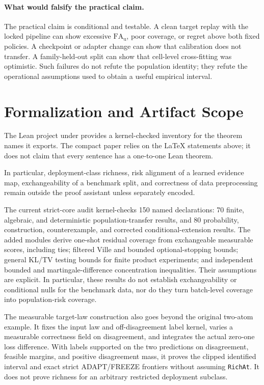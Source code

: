 \paragraph{What would falsify the practical claim.}
The practical claim is conditional and testable. A clean target replay with the locked pipeline can
show excessive $\mathrm{FA}_{\mathrm u}$, poor coverage, or regret above both fixed policies. A
checkpoint or adapter change can show that calibration does not transfer. A family-held-out split
can show that cell-level cross-fitting was optimistic. Such failures do not refute the population
identity; they refute the operational assumptions used to obtain a useful empirical interval.

\section{Formalization and Artifact Scope}
\label{app:compact-formal}

The Lean project under  provides a kernel-checked inventory for
the theorem names it exports. The compact paper relies on the LaTeX statements above; it does not
claim that every sentence has a one-to-one Lean theorem.

In particular, deployment-class richness,
risk alignment of a learned evidence map, exchangeability of a benchmark split, and correctness of
data preprocessing remain outside the proof assistant unless separately encoded.

The current strict-core audit kernel-checks 150 named declarations: 70 finite, algebraic,
and deterministic population-transfer results, and 80 probability, construction,
counterexample, and corrected conditional-extension results. The added modules derive one-shot residual
coverage from exchangeable measurable scores, including ties; filtered Ville and bounded
optional-stopping bounds; general KL/TV testing bounds for finite product experiments; and
independent bounded and martingale-difference concentration inequalities. Their assumptions are
explicit. In particular, these results do not establish exchangeability or conditional nulls for
the benchmark data, nor do they turn batch-level coverage into population-risk coverage.

The measurable target-law construction also goes beyond the original two-atom example. It fixes
the input law and off-disagreement label kernel, varies a measurable correctness field on
disagreement, and integrates the actual zero-one loss difference. With labels supported on the
two predictions on disagreement, feasible margins, and positive disagreement mass, it proves the
clipped identified interval and exact strict ADAPT/FREEZE frontiers without assuming
\texttt{RichAt}. It does not prove richness for an arbitrary restricted deployment subclass.

